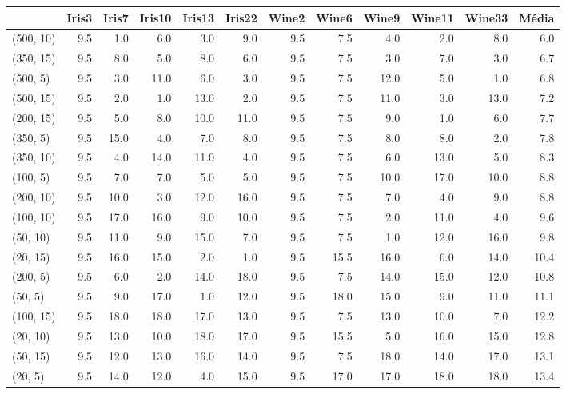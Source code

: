 \begin{table}
\centering
\label{tab:ranks_GRASP}
\begin{tabular}{lrrrrrrrrrrr}
\toprule
{} &  Iris3 &  Iris7 &  Iris10 &  Iris13 &  Iris22 &  Wine2 &  Wine6 &  Wine9 &  Wine11 &  Wine33 &  Média \\
\midrule
(500, 10) &    9.5 &    1.0 &     6.0 &     3.0 &     9.0 &    9.5 &    7.5 &    4.0 &     2.0 &     8.0 &    6.0 \\
(350, 15) &    9.5 &    8.0 &     5.0 &     8.0 &     6.0 &    9.5 &    7.5 &    3.0 &     7.0 &     3.0 &    6.7 \\
(500, 5)  &    9.5 &    3.0 &    11.0 &     6.0 &     3.0 &    9.5 &    7.5 &   12.0 &     5.0 &     1.0 &    6.8 \\
(500, 15) &    9.5 &    2.0 &     1.0 &    13.0 &     2.0 &    9.5 &    7.5 &   11.0 &     3.0 &    13.0 &    7.2 \\
(200, 15) &    9.5 &    5.0 &     8.0 &    10.0 &    11.0 &    9.5 &    7.5 &    9.0 &     1.0 &     6.0 &    7.7 \\
(350, 5)  &    9.5 &   15.0 &     4.0 &     7.0 &     8.0 &    9.5 &    7.5 &    8.0 &     8.0 &     2.0 &    7.8 \\
(350, 10) &    9.5 &    4.0 &    14.0 &    11.0 &     4.0 &    9.5 &    7.5 &    6.0 &    13.0 &     5.0 &    8.3 \\
(100, 5)  &    9.5 &    7.0 &     7.0 &     5.0 &     5.0 &    9.5 &    7.5 &   10.0 &    17.0 &    10.0 &    8.8 \\
(200, 10) &    9.5 &   10.0 &     3.0 &    12.0 &    16.0 &    9.5 &    7.5 &    7.0 &     4.0 &     9.0 &    8.8 \\
(100, 10) &    9.5 &   17.0 &    16.0 &     9.0 &    10.0 &    9.5 &    7.5 &    2.0 &    11.0 &     4.0 &    9.6 \\
(50, 10)  &    9.5 &   11.0 &     9.0 &    15.0 &     7.0 &    9.5 &    7.5 &    1.0 &    12.0 &    16.0 &    9.8 \\
(20, 15)  &    9.5 &   16.0 &    15.0 &     2.0 &     1.0 &    9.5 &   15.5 &   16.0 &     6.0 &    14.0 &   10.4 \\
(200, 5)  &    9.5 &    6.0 &     2.0 &    14.0 &    18.0 &    9.5 &    7.5 &   14.0 &    15.0 &    12.0 &   10.8 \\
(50, 5)   &    9.5 &    9.0 &    17.0 &     1.0 &    12.0 &    9.5 &   18.0 &   15.0 &     9.0 &    11.0 &   11.1 \\
(100, 15) &    9.5 &   18.0 &    18.0 &    17.0 &    13.0 &    9.5 &    7.5 &   13.0 &    10.0 &     7.0 &   12.2 \\
(20, 10)  &    9.5 &   13.0 &    10.0 &    18.0 &    17.0 &    9.5 &   15.5 &    5.0 &    16.0 &    15.0 &   12.8 \\
(50, 15)  &    9.5 &   12.0 &    13.0 &    16.0 &    14.0 &    9.5 &    7.5 &   18.0 &    14.0 &    17.0 &   13.1 \\
(20, 5)   &    9.5 &   14.0 &    12.0 &     4.0 &    15.0 &    9.5 &   17.0 &   17.0 &    18.0 &    18.0 &   13.4 \\
\bottomrule
\end{tabular}
\end{table}
